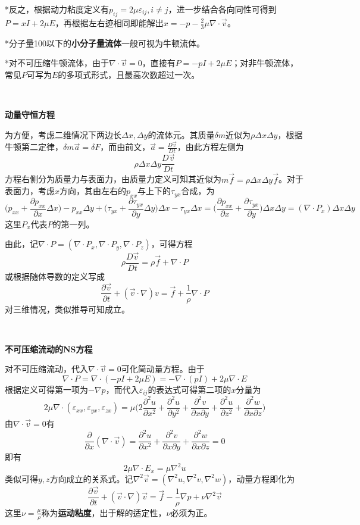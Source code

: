 \documentclass[a4paper,UTF8,fontset=windows]{ctexart}
\begin{document}
*反之，根据动力粘度定义有$p_{ij}=2\mu\varepsilon_{ij},i\ne j$，进一步结合各向同性可得到$P=xI+2\mu E$，再根据左右迹相同即能解出$x=-p-\frac{2}{3}\mu\nabla\cdot\vec{v}$。

*分子量100以下的\textbf{小分子量流体}一般可视为牛顿流体。

*对不可压缩牛顿流体，由于$\nabla\cdot\vec{v}=0$，直接有$P=-pI+2\mu E$；对非牛顿流体，常见$P$可写为$E$的多项式形式，且最高次数超过一次。

\

\textbf{动量守恒方程}

为方便，考虑二维情况下两边长$\Delta x,\Delta y$的流体元。其质量$\delta m$近似为$\rho\Delta x\Delta y$，根据牛顿第二定律，$\delta m\vec{a}=\delta F$，而由前文，$\vec{a}=\frac{D\vec{v}}{Dt}$，由此方程左侧为
$$\rho\Delta x\Delta y\frac{D\vec{v}}{Dt}$$
方程右侧分为质量力与表面力，由质量力定义可知其近似为$m\vec{f}=\rho\Delta x\Delta y\vec{f}$。对于表面力，考虑$x$方向，其由左右的$p_{xx}$与上下的$\tau_{yx}$合成，为
$$\bigg(p_{xx}+\frac{\partial p_{xx}}{\partial x}\Delta x\bigg)-p_{xx}\Delta y+\bigg(\tau_{yx}+\frac{\partial \tau_{yx}}{\partial y}\Delta y\bigg)\Delta x-\tau_{yx}\Delta x=\bigg(\frac{\partial p_{xx}}{\partial x}+\frac{\partial\tau_{yx}}{\partial y}\bigg)\Delta x\Delta y=(\nabla\cdot P_x)\Delta x\Delta y$$
这里$P_x$代表$P$的第一列。

由此，记$\nabla\cdot P=(\nabla\cdot P_x,\nabla\cdot P_y,\nabla\cdot P_z)$，可得方程
$$\rho\frac{D\vec{v}}{Dt}=\rho\vec{f}+\nabla\cdot P$$
或根据随体导数的定义写成
$$\frac{\partial\vec{v}}{\partial t}+(\vec{v}\cdot\nabla)v=\vec{f}+\frac{1}{\rho}\nabla\cdot P$$
对三维情况，类似推导可知成立。

\

\textbf{不可压缩流动的NS方程}

对不可压缩流动，代入$\nabla\cdot\vec{v}=0$可化简动量方程。由于
$$\nabla\cdot P=\nabla\cdot(-pI+2\mu E)=-\nabla\cdot(pI)+2\mu\nabla\cdot E$$
根据定义可得第一项为$-\nabla p$，而代入$\varepsilon_{ij}$的表达式可得第二项的$x$分量为
$$2\mu\nabla\cdot(\varepsilon_{xx},\varepsilon_{yx},\varepsilon_{zx})=\mu\bigg(2\frac{\partial^2u}{\partial x^2}+\frac{\partial^2u}{\partial y^2}+\frac{\partial^2v}{\partial x\partial y}+\frac{\partial^2u}{\partial z^2}+\frac{\partial^2w}{\partial x\partial z}\bigg)$$
由$\nabla\cdot\vec{v}=0$有
$$\frac{\partial}{\partial x}(\nabla\cdot\vec{v})=\frac{\partial^2u}{\partial x^2}+\frac{\partial^2v}{\partial x\partial y}+\frac{\partial^2w}{\partial x\partial z}=0$$
即有
$$2\mu\nabla\cdot E_x=\mu\nabla^2u$$
类似可得$y,z$方向成立的关系式。记$\nabla^2\vec{v}=(\nabla^2u,\nabla^2v,\nabla^2w)$，动量方程即化为
$$\frac{\partial\vec{v}}{\partial t}+(\vec{v}\cdot\nabla)\vec{v}=\vec{f}-\frac{1}{\rho}\nabla p+\nu\nabla^2\vec{v}$$
这里$\nu=\frac{\mu}{\rho}$称为\textbf{运动粘度}，出于解的适定性，$\nu$必须为正。
\end{document}
